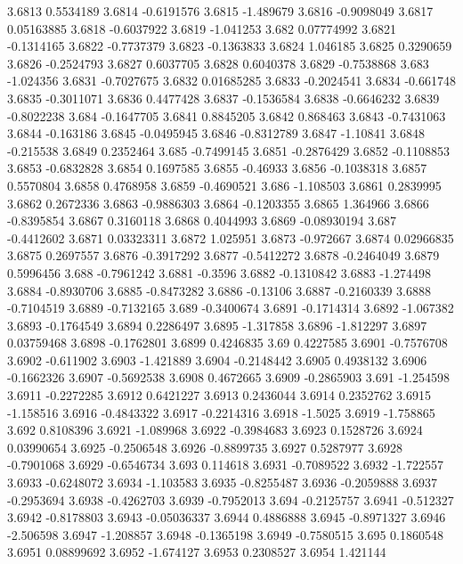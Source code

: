 3.6813  0.5534189
3.6814  -0.6191576
3.6815  -1.489679
3.6816  -0.9098049
3.6817  0.05163885
3.6818  -0.6037922
3.6819  -1.041253
3.682  0.07774992
3.6821  -0.1314165
3.6822  -0.7737379
3.6823  -0.1363833
3.6824  1.046185
3.6825  0.3290659
3.6826  -0.2524793
3.6827  0.6037705
3.6828  0.6040378
3.6829  -0.7538868
3.683  -1.024356
3.6831  -0.7027675
3.6832  0.01685285
3.6833  -0.2024541
3.6834  -0.661748
3.6835  -0.3011071
3.6836  0.4477428
3.6837  -0.1536584
3.6838  -0.6646232
3.6839  -0.8022238
3.684  -0.1647705
3.6841  0.8845205
3.6842  0.868463
3.6843  -0.7431063
3.6844  -0.163186
3.6845  -0.0495945
3.6846  -0.8312789
3.6847  -1.10841
3.6848  -0.215538
3.6849  0.2352464
3.685  -0.7499145
3.6851  -0.2876429
3.6852  -0.1108853
3.6853  -0.6832828
3.6854  0.1697585
3.6855  -0.46933
3.6856  -0.1038318
3.6857  0.5570804
3.6858  0.4768958
3.6859  -0.4690521
3.686  -1.108503
3.6861  0.2839995
3.6862  0.2672336
3.6863  -0.9886303
3.6864  -0.1203355
3.6865  1.364966
3.6866  -0.8395854
3.6867  0.3160118
3.6868  0.4044993
3.6869  -0.08930194
3.687  -0.4412602
3.6871  0.03323311
3.6872  1.025951
3.6873  -0.972667
3.6874  0.02966835
3.6875  0.2697557
3.6876  -0.3917292
3.6877  -0.5412272
3.6878  -0.2464049
3.6879  0.5996456
3.688  -0.7961242
3.6881  -0.3596
3.6882  -0.1310842
3.6883  -1.274498
3.6884  -0.8930706
3.6885  -0.8473282
3.6886  -0.13106
3.6887  -0.2160339
3.6888  -0.7104519
3.6889  -0.7132165
3.689  -0.3400674
3.6891  -0.1714314
3.6892  -1.067382
3.6893  -0.1764549
3.6894  0.2286497
3.6895  -1.317858
3.6896  -1.812297
3.6897  0.03759468
3.6898  -0.1762801
3.6899  0.4246835
3.69  0.4227585
3.6901  -0.7576708
3.6902  -0.611902
3.6903  -1.421889
3.6904  -0.2148442
3.6905  0.4938132
3.6906  -0.1662326
3.6907  -0.5692538
3.6908  0.4672665
3.6909  -0.2865903
3.691  -1.254598
3.6911  -0.2272285
3.6912  0.6421227
3.6913  0.2436044
3.6914  0.2352762
3.6915  -1.158516
3.6916  -0.4843322
3.6917  -0.2214316
3.6918  -1.5025
3.6919  -1.758865
3.692  0.8108396
3.6921  -1.089968
3.6922  -0.3984683
3.6923  0.1528726
3.6924  0.03990654
3.6925  -0.2506548
3.6926  -0.8899735
3.6927  0.5287977
3.6928  -0.7901068
3.6929  -0.6546734
3.693  0.114618
3.6931  -0.7089522
3.6932  -1.722557
3.6933  -0.6248072
3.6934  -1.103583
3.6935  -0.8255487
3.6936  -0.2059888
3.6937  -0.2953694
3.6938  -0.4262703
3.6939  -0.7952013
3.694  -0.2125757
3.6941  -0.512327
3.6942  -0.8178803
3.6943  -0.05036337
3.6944  0.4886888
3.6945  -0.8971327
3.6946  -2.506598
3.6947  -1.208857
3.6948  -0.1365198
3.6949  -0.7580515
3.695  0.1860548
3.6951  0.08899692
3.6952  -1.674127
3.6953  0.2308527
3.6954  1.421144
